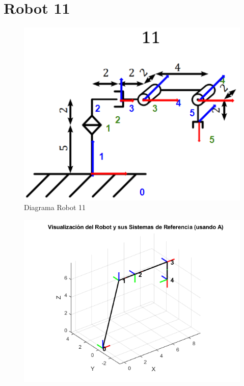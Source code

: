 \section{Robot 11}
\begin{figure}[h]
	\centering
	\includegraphics[width=0.7\linewidth]{../Prueba_DH/img/Diagrama11}
	\caption{Diagrama Robot 11}
	\label{fig:diagrama11}
\end{figure}
\begin{figure}
	\centering
	\includegraphics[width=0.7\linewidth]{../Prueba_DH/img/MatLab11}
	\caption{}
	\label{fig:matlab11}
\end{figure}
